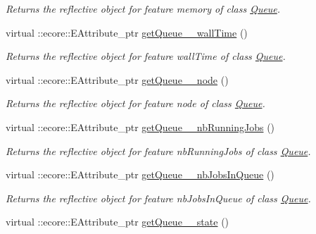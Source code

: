 \begin{DoxyCompactItemize}
\begin{DoxyCompactList}\small\item\em Returns the reflective object for feature memory of class \hyperlink{classTMS__Data_1_1Queue}{Queue}. \item\end{DoxyCompactList}\item 
virtual ::ecore::EAttribute\_\-ptr \hyperlink{classTMS__Data_1_1TMS__DataPackage_af4d449751ee53be53f200ce8ae0f3be1}{getQueue\_\-\_\-wallTime} ()
\begin{DoxyCompactList}\small\item\em Returns the reflective object for feature wallTime of class \hyperlink{classTMS__Data_1_1Queue}{Queue}. \item\end{DoxyCompactList}\item 
virtual ::ecore::EAttribute\_\-ptr \hyperlink{classTMS__Data_1_1TMS__DataPackage_a045d5480ba947f66d7cc9620a981ddd8}{getQueue\_\-\_\-node} ()
\begin{DoxyCompactList}\small\item\em Returns the reflective object for feature node of class \hyperlink{classTMS__Data_1_1Queue}{Queue}. \item\end{DoxyCompactList}\item 
virtual ::ecore::EAttribute\_\-ptr \hyperlink{classTMS__Data_1_1TMS__DataPackage_a414ee29d522d3b684ca37cae813aefd6}{getQueue\_\-\_\-nbRunningJobs} ()
\begin{DoxyCompactList}\small\item\em Returns the reflective object for feature nbRunningJobs of class \hyperlink{classTMS__Data_1_1Queue}{Queue}. \item\end{DoxyCompactList}\item 
virtual ::ecore::EAttribute\_\-ptr \hyperlink{classTMS__Data_1_1TMS__DataPackage_acc8510b02a965b54295badadc3f234ad}{getQueue\_\-\_\-nbJobsInQueue} ()
\begin{DoxyCompactList}\small\item\em Returns the reflective object for feature nbJobsInQueue of class \hyperlink{classTMS__Data_1_1Queue}{Queue}. \item\end{DoxyCompactList}\item 
virtual ::ecore::EAttribute\_\-ptr \hyperlink{classTMS__Data_1_1TMS__DataPackage_a92fbebfe14252ba67127fe4f46a96a18}{getQueue\_\-\_\-state} ()

\end{DoxyCompactItemize}
